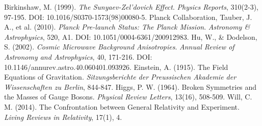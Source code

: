 \documentclass[12pt,a4paper]{article}
\begin{document}
\begin{thebibliography}{99}
		 Birkinshaw, M. (1999). \textit{The Sunyaev-Zel'dovich Effect}. \textit{Physics Reports}, 310(2-3), 97-195. DOI: 10.1016/S0370-1573(98)00080-5.
		 Planck Collaboration, Tauber, J. A., et al. (2010). \textit{Planck Pre-launch Status: The Planck Mission}. \textit{Astronomy \& Astrophysics}, 520, A1. DOI: 10.1051/0004-6361/200912983.
		 Hu, W., \& Dodelson, S. (2002). \textit{Cosmic Microwave Background Anisotropies}. \textit{Annual Review of Astronomy and Astrophysics}, 40, 171-216. DOI: 10.1146/annurev.astro.40.060401.093926.
		 Einstein, A. (1915). The Field Equations of Gravitation. \textit{Sitzungsberichte der Preussischen Akademie der Wissenschaften zu Berlin}, 844-847.
		 Higgs, P. W. (1964). Broken Symmetries and the Masses of Gauge Bosons. \textit{Physical Review Letters}, 13(16), 508-509.
		 Will, C. M. (2014). The Confrontation between General Relativity and Experiment. \textit{Living Reviews in Relativity}, 17(1), 4.
	\end{thebibliography}
	
\end{document}
